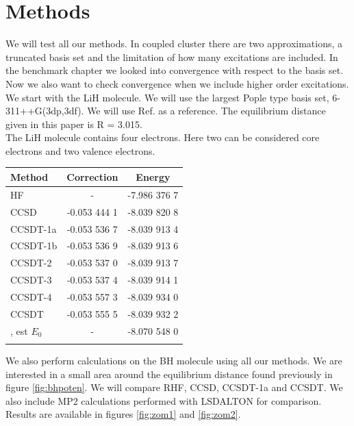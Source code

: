 \documentclass[a4paper,norsk,11pt,twoside]{report}
\begin{document}
\section{Methods}
We will test all our methods. In coupled cluster there are two approximations, a truncated basis set and the limitation of how many excitations are included. In the benchmark chapter we looked into convergence with respect to the basis set. Now we also want to check convergence when we include higher order excitations. \\

We start with the LiH molecule. We will use the largest Pople type basis set, 6-311++G(3dp,3df). We will use Ref.\cite{very_accurate_lih_poten} as a reference. The equilibrium distance given in this paper is R = 3.015. \\

The LiH molecule contains four electrons. Here two can be considered core electrons and two valence electrons. 
 
\begin{center}
\begin{tabular}{ l c c}
	\hline
  	Method & Correction & Energy \\ \hline
  	HF & - &  -7.986 376 7\\
  	CCSD     &  -0.053 444 1  & -8.039 820 8 \\ 
    CCSDT-1a &  -0.053 536 7  & -8.039 913 4 \\ 
  	CCSDT-1b &  -0.053 536 9  & -8.039 913 6 \\
  	CCSDT-2  &  -0.053 537 0  & -8.039 913 7        \\ 
  	CCSDT-3  &  -0.053 537 4  & -8.039 914 1        \\ 
  	CCSDT-4  &  -0.053 557 3  & -8.039 934 0    \\ 
  	CCSDT    &  -0.053 555 5  &  -8.039 932 2    \\ 
  	\cite{very_accurate_lih_poten}, est $E_0$ & - & -8.070 548 0 \\ \hline
  	\\
	\end{tabular}
\end{center}

We also perform calculations on the BH molecule using all our methods. We are interested in a small area around the equilibrium distance found previously in figure \ref{fig:bhpoten}. We will compare RHF, CCSD, CCSDT-1a and CCSDT. We also include MP2 calculations performed with LSDALTON for comparison. Results are available in figures \ref{fig:zom1} and \ref{fig:zom2}. 
\end{document}
